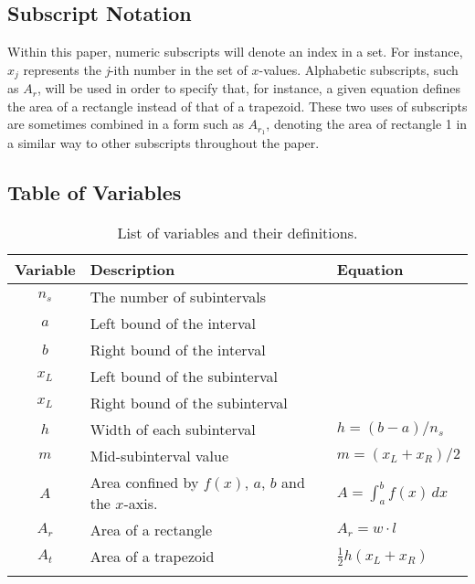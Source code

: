 \documentclass{paper}
\begin{document}
\subsection{Subscript Notation}
Within this paper, numeric subscripts will denote an index in a set.
For instance, \(x_j\) represents the \emph{j}-ith number in the set of \(x\)-values.
Alphabetic subscripts, such as \(A_r\), will be used in order to specify that, for instance, a given equation defines the area of a rectangle instead of that of a trapezoid.
These two uses of subscripts are sometimes combined in a form such as \(A_{r_1}\), denoting the area of rectangle 1 in a similar way to other subscripts throughout the paper.

\subsection{Table of Variables}
\renewcommand{\arraystretch}{1.1}
\begin{table}[ht]
    \centering
    \begin{tabular}{cll}
            \dtoprule
            \textbf{Variable}   &   \textbf{Description}            &   \textbf{Equation}       \\
            \hline
            \(n_s\)             &   The number of subintervals      &                           \\
            \(a\)               &   Left bound of the interval      &                           \\
            \(b\)               &   Right bound of the interval     &                           \\
            \(x_L\)             &   Left bound of the subinterval   &                           \\
            \(x_L\)             &   Right bound of the subinterval  &                           \\
            \(h\)               &   Width of each subinterval       &   \(h=(b-a)/n_s\)         \\
            \(m\)               &   Mid-subinterval value           &   \(m=(x_L+x_R)/2\)       \\
            \(A\)               &   Area confined by \(f(x)\), \(a\), \(b\) and the \(x\)-axis. & \(A=\int_a^b f(x) \, dx\) \\
            \(A_r\)             &   Area of a rectangle             &   \(A_r=w \cdot l\)       \\
            \(A_t\)             &   Area of a trapezoid             &   \(\frac{1}{2} h (x_L + x_R)\)  \\
            \dbottomrule
    \end{tabular}
    \caption{List of variables and their definitions.}
    \label{table:variables}
\end{table}
\end{document}
